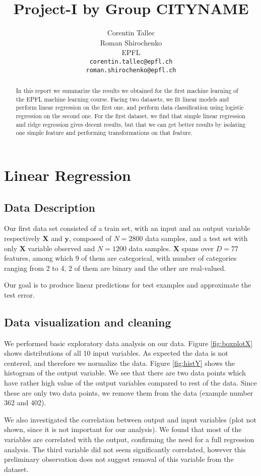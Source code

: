\documentclass{article} %
\title{Project-I by Group CITYNAME}
\author{
Corentin Tallec\\
Roman Shirochenko\\
EPFL \\
\texttt{corentin.tallec@epfl.ch\\
roman.shirochenko@epfl.ch} \\
}
\begin{document}
\maketitle

\begin{abstract}
	In this report we summarize the results we obtained for the first machine
	learning of the EPFL machine learning course. Facing two datasets, we fit
	linear models and perform linear regression on the first one, and perform data
	classification using logistic regression on the second one. For the first
	dataset, we find that simple linear regression and ridge regression gives
	decent results, but that we can get better results by isolating one simple
	feature and performing transformations on that feature.
\end{abstract}

\section{Linear Regression}
\subsection{Data Description}
Our first data set consisted of a train set, with an input and an output
variable respectively $\mathbf{X}$ and $\mathbf{y}$, composed of $N=2800$ data
samples, and a test set with only $\mathbf{X}$ variable observed and $N=1200$
data samples. $\mathbf{X}$ spans over $D=77$ features, among which 9 of them are
categorical, with number of categories ranging from 2 to 4, 2 of them are binary
and the other are real-valued.

Our goal is to produce linear predictions for test examples and approximate the
test error.

\subsection{Data visualization and cleaning}
We performed basic exploratory data analysis on our data. Figure \ref{fig:boxplotX} shows distributions of all 10 input variables. As expected the data is not centered, and therefore we normalize the data. Figure \ref{fig:histY} shows the histogram of the output variable. We see that there are two data points which have rather high value of the output variables compared to rest of the data. Since these are only two data points, we remove them from the data (example number 362 and 402).

We also investigated the correlation between output and input variables (plot not shown, since it is not important for our analysis). We found that most of the variables are correlated with the output, confirming the need for a full regression analysis. The third variable did not seem significantly correlated, however this preliminary observation does not suggest removal of this variable from the dataset.
\end{document}
